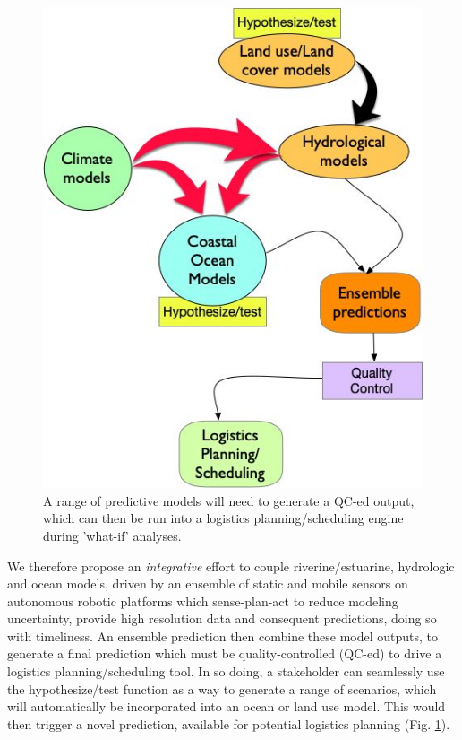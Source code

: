 \begin{figure}
  \centering
  \includegraphics[scale=0.30]{fig/process.jpg}
  \caption{A range of predictive models will need to generate a QC-ed
    output, which can then be run into a logistics planning/scheduling
    engine during 'what-if' analyses.}
  \label{fig:process}
\end{figure}

We therefore propose an \emph{integrative} effort to couple
riverine/estuarine, hydrologic and ocean models, driven by an ensemble
of static and mobile sensors on autonomous robotic platforms which
sense-plan-act to reduce modeling uncertainty, provide high resolution
data and consequent predictions, doing so with timeliness. An ensemble
prediction then combine these model outputs, to generate a final
prediction which must be quality-controlled (QC-ed) to drive a
logistics planning/scheduling tool. In so doing, a stakeholder can
seamlessly use the hypothesize/test function as a way to generate a
range of scenarios, which will automatically be incorporated into an
ocean or land use model. This would then trigger a novel prediction,
available for potential logistics planning (Fig. \ref{fig:process}).


